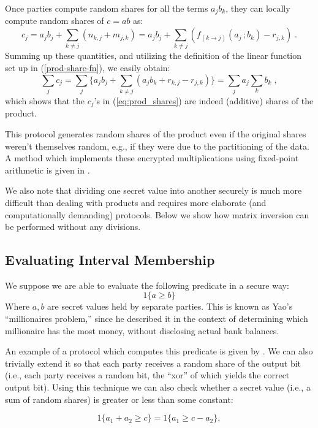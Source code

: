 \documentclass[11pt]{article}
\begin{document}
Once parties compute random shares  for all the terms $a_jb_k$, they can locally compute random shares of $c=ab$ as:
\begin{equation}\label{eq:prod_shares}
c_j = a_jb_j + \sum_{k\neq j}(n_{k,j} + m_{j,k}) = a_jb_j + \sum_{k\neq j}(f_{(k \rightarrow j)}(a_j\,;b_k) - r_{j,k})  \; .
\end{equation}
Summing up these quantities, and utilizing the definition of the linear function set up in (\ref{prod-share-fn}), we easily obtain:
\begin{equation}
\sum_j c_j = \sum_j\big\{a_jb_j + \sum_{k\neq j}(a_jb_k + r_{k,j} - r_{j,k})\big\} = \sum_j{a_j\sum_k{b_k}} \; , \nonumber
\end{equation}
which shows that the $c_j$'s in (\ref{eq:prod_shares}) are indeed (additive) shares of the product.

This protocol generates random shares of the product even if the original shares weren't themselves random, e.g., if they were due to the partitioning of the data.  A method which implements these encrypted multiplications using fixed-point arithmetic is given in \cite{fhn:10}.  

We also note that dividing one secret value into another securely is much more difficult than dealing with products and requires more elaborate (and computationally demanding) protocols.  Below we show how matrix inversion can be performed without any divisions.

\subsection{Evaluating Interval Membership}\label{sec:yaosgt}
We suppose we are able to evaluate the following predicate in a secure way:
$$1\{a \geq b\}$$
Where $a,b$ are secret values held by separate parties.  This is known as Yao's ``millionaires problem,'' since he described it in the context of determining which millionaire has the most money, without disclosing actual bank balances.

An example of a protocol which computes this predicate is given by \citet{gt_proto}.  We can also trivially extend it so that each party receives a random share of the output bit (i.e., each party receives a random bit, the ``xor'' of which yields the correct output bit).  Using this technique we can also check whether a secret value (i.e., a sum of random shares) is greater or less than some constant:

\begin{equation}\label{yaos-gt-eqn} 1\{a_1+a_2 \geq c\} = 1\{a_1 \geq c-a_2\},\end{equation}
\end{document}
